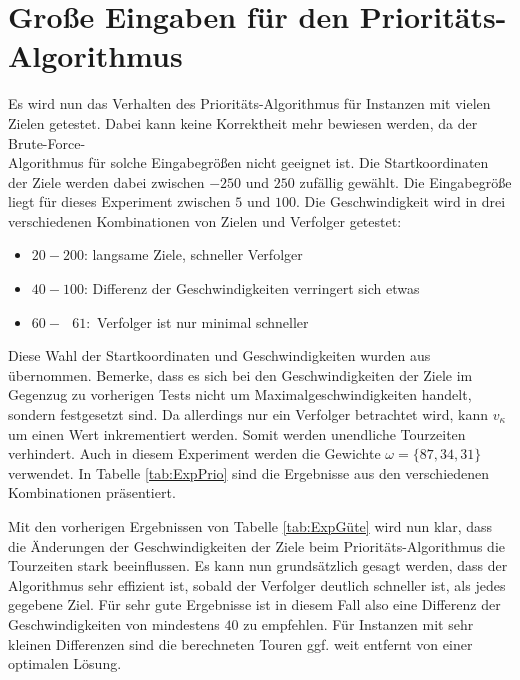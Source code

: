\documentclass[german,version-2019-11]{uzl-thesis}
\begin{document}
\section{Große Eingaben für den Prioritäts-Algorithmus}
Es wird nun das Verhalten des Prioritäts-Algorithmus für Instanzen mit vielen Zielen getestet. Dabei kann keine Korrektheit mehr bewiesen werden, da der Brute-Force-\\Algorithmus für solche Eingabegrößen nicht geeignet ist. Die Startkoordinaten der Ziele werden dabei zwischen $-250$ und $250$ zufällig gewählt. Die Eingabegröße liegt für dieses Experiment zwischen $5$ und $100$. Die Geschwindigkeit wird in drei verschiedenen Kombinationen von Zielen und Verfolger getestet:
\begin{itemize}
\item $20-200$: langsame Ziele, schneller Verfolger
\item $40-100$: Differenz der Geschwindigkeiten verringert sich etwas
\item $60-~~~61$:~Verfolger ist nur minimal schneller
\end{itemize}
Diese Wahl der Startkoordinaten und Geschwindigkeiten wurden aus \cite{stieber2015multiple} übernommen. Bemerke, dass es sich bei den Geschwindigkeiten der Ziele im Gegenzug zu vorherigen Tests nicht um Maximalgeschwindigkeiten handelt, sondern festgesetzt sind. Da allerdings nur ein Verfolger betrachtet wird, kann $v_{\kappa}$ um einen Wert inkrementiert werden. Somit werden unendliche Tourzeiten verhindert. Auch in diesem Experiment werden die Gewichte $\omega = \{87,34,31\}$ verwendet. In Tabelle \ref{tab:ExpPrio} sind die Ergebnisse aus den verschiedenen Kombinationen präsentiert.

Mit den vorherigen Ergebnissen von Tabelle \ref{tab:ExpGüte} wird nun klar, dass die Änderungen der Geschwindigkeiten der Ziele beim Prioritäts-Algorithmus die Tourzeiten stark beeinflussen. Es kann nun grundsätzlich gesagt werden, dass der Algorithmus sehr effizient ist, sobald der Verfolger deutlich schneller ist, als jedes gegebene Ziel. Für sehr gute Ergebnisse ist in diesem Fall also eine Differenz der Geschwindigkeiten von mindestens $40$ zu empfehlen. Für Instanzen mit sehr kleinen Differenzen sind die berechneten Touren ggf. weit entfernt von einer optimalen Lösung. \\
\end{document}
